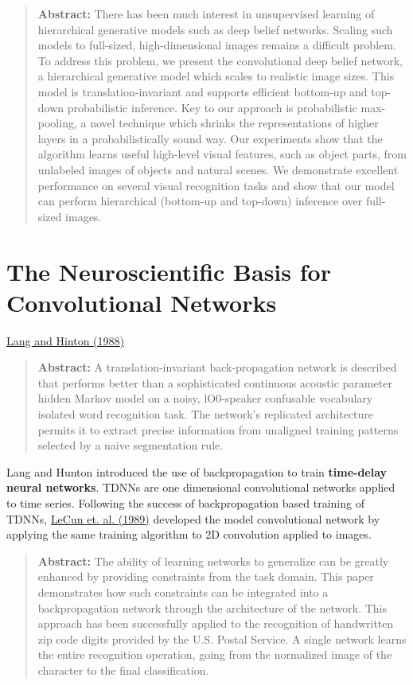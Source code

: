 \documentclass[onecolumn, letterpaper, 12pt]{report}
\begin{document}
\begin{quote}
  \textbf{Abstract: } There has been much interest in unsupervised
learning of hierarchical generative models such as deep belief
networks. Scaling such models to full-sized, high-dimensional images
remains a difficult problem. To address this problem, we present the
convolutional deep belief network, a hierarchical generative model
which scales to realistic image sizes. This model is
translation-invariant and supports efficient bottom-up and top-down
probabilistic inference. Key to our approach is probabilistic
max-pooling, a novel technique which shrinks the representations of
higher layers in a probabilistically sound way. Our experiments show
that the algorithm learns useful high-level visual features, such as
object parts, from unlabeled images of objects and natural scenes. We
demonstrate excellent performance on several visual recognition tasks
and show that our model can perform hierarchical (bottom-up and
top-down) inference over full-sized images.
\end{quote}

\section{The Neuroscientific Basis for Convolutional Networks}

\href{http://www.cs.toronto.edu/~fritz/absps/langTDNN.pdf}{Lang and Hinton (1988)}

\begin{quote}
  \textbf{Abstract: } A translation-invariant back-propagation network
is described that performs better than a sophisticated continuous
acoustic parameter hidden Markov model on a noisy, lO0-speaker
confusable vocabulary isolated word recognition task. The network's
replicated architecture permits it to extract precise information from
unaligned training patterns selected by a naive segmentation rule.
\end{quote}

Lang and Hunton introduced the use of backpropagation to train \textbf{time-delay neural networks}. TDNNs are one dimensional convolutional networks applied to time series. Following the success of backpropagation based training of TDNNs, 
\href{http://yann.lecun.com/exdb/publis/pdf/lecun-89e.pdf}{LeCun et. al. (1989)} developed the model convolutional network by applying the same training algorithm to 2D convolution applied to images.

\begin{quote}
  \textbf{Abstract: } The ability of learning networks to generalize can be greatly enhanced by providing constraints from the task domain. This paper demonstrates how such constraints can be integrated into a backpropagation network through the architecture of the network. This approach has been successfully applied to the recognition of handwritten zip code digits provided by the U.S. Postal Service. A single network learns the entire recognition operation, going from the normalized image of the character to the final classification.
\end{quote}
\end{document}
